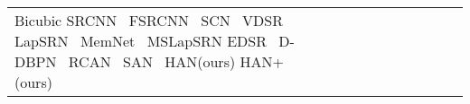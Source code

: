 \documentclass[runningheads]{llncs}
\begin{document}
\begin{table}[!ht]
\begin{tabular}{|p{7em}|p{2.5em}|p{2.5em}|p{3em}|p{2.5em}|p{3em}|p{2.5em}|p{3em}|p{2.5em}|p{3em}|p{2.5em}|p{3em}|}
		\hline
		\hline
		Bicubic \newline{}SRCNN~\cite{dong2014learning} \newline{} FSRCNN~\cite{dong2016accelerating} \newline{} SCN~\cite{wang2015deep} \newline{} VDSR~\cite{kim2016accurate} \newline{} LapSRN~\cite{lai2017deep} \newline{} MemNet~\cite{tai2017memnet} \newline{} MSLapSRN\cite{lai2017deep} \newline{} EDSR~\cite{lim2017enhanced} \newline{}  D-DBPN~\cite{haris2018deep} \newline{}  RCAN~\cite{zhang2018image} \newline{}  SAN~\cite{dai2019second} \newline{} HAN(ours) \newline{} HAN+(ours) &

\end{tabular}
\end{table}
\end{document}
